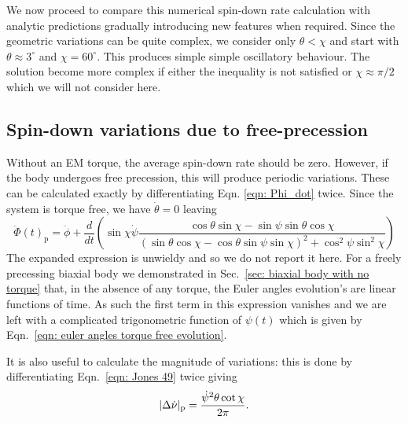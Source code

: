 \documentclass[../full_thesis/full_thesis.tex]{subfiles}
\begin{document}
We now proceed to compare this numerical spin-down rate calculation with analytic
predictions gradually introducing new features when required. Since the geometric
variations can be quite complex, we consider only $\theta < \chi$ and start
with $\theta \approx 3^{\circ}$ and $\chi=60^{\circ}$. This produces simple
simple oscillatory behaviour. The solution become more complex if either
the inequality is not satisfied or $\chi \approx \pi/2$ which we will not
consider here.

\subsection{Spin-down variations due to free-precession}
\label{sec: spin-down free precession}

Without an EM torque, the average spin-down rate should be zero. However, if
the body undergoes free precession, this will produce periodic variations.
These can be calculated exactly by differentiating Eqn. \eqref{eqn: Phi_dot}
twice. Since the system is torque free, we have $\dot{\theta} = 0$ leaving
\begin{equation}
    \ddot{\Phi}(t)_{\mathrm{p}} = \ddot{\phi} + \frac{d}{dt}\left(
        \sin\chi\dot{\psi} \frac{\cos\theta\sin\chi - \sin \psi \sin \theta \cos\chi
}{(\sin\theta \cos \chi - \cos \theta \sin \psi \sin \chi)^{2} + \cos^{2}\psi \sin^{2} \chi}
\right)
\label{eqn: Phi_ddot FP}
\end{equation}
The expanded expression is unwieldy and so we do not report it here. For a
freely precessing biaxial body we demonstrated in Sec.~\ref{sec: biaxial body
with no torque} that, in the absence of any torque, the Euler angles evolution's
are linear functions of time. As such the first term in this expression
vanishes and we are left with a complicated trigonometric function of $\psi(t)$
which is given by Eqn.~\eqref{eqn: euler angles torque free evolution}.

It is also useful to calculate the magnitude of variations: this is done by
differentiating Eqn.~\eqref{eqn: Jones 49} twice giving
\begin{equation}
    |\Delta\dot{\nu}|_{\mathrm{p}} =\frac{\dot{\psi}^{2} \theta \cot\chi}{2\pi}.
    \label{eqn: spin-down variations FP}
\end{equation}
\end{document}
